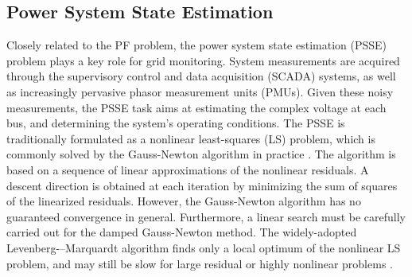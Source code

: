 \documentclass[journal,twoside]{IEEEtran}
\begin{document}
\subsection{Power System State Estimation}

Closely related to the PF problem, the power system state estimation (PSSE) problem plays a key  role for grid monitoring.
System measurements are acquired through the supervisory control and data acquisition (SCADA) systems,
as well as increasingly pervasive phasor measurement units (PMUs).
Given these noisy measurements, the PSSE task aims at estimating the complex voltage at each bus,
and determining the system's operating conditions.
The PSSE is traditionally formulated as a nonlinear least-squares (LS) problem,
which is commonly solved by the Gauss-Newton algorithm in practice \cite{Monticelli12,Abur04}.
The algorithm is based on a sequence of linear approximations of the nonlinear residuals.
A descent direction is obtained at each iteration by minimizing the sum of squares of the linearized residuals.
However, the Gauss-Newton algorithm has no guaranteed convergence  in general.
Furthermore, a linear search must be carefully carried out for the damped Gauss-Newton method.
The widely-adopted Levenberg-–Marquardt algorithm finds only a local optimum of the nonlinear LS problem,
and may still be slow for large residual or highly nonlinear problems \cite{Bjorck96, Mascarenhas14}.
\end{document}

